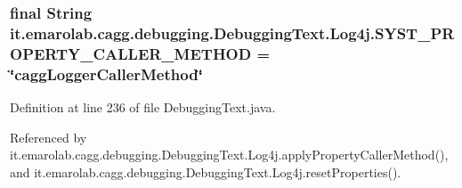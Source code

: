 \hypertarget{classit_1_1emarolab_1_1cagg_1_1debugging_1_1DebuggingText_1_1Log4j_a142198cde93bd152b90429bec42beeb2}{
\subsubsection[{S\-Y\-S\-T\-\_\-\-P\-R\-O\-P\-E\-R\-T\-Y\-\_\-\-C\-A\-L\-L\-E\-R\-\_\-\-M\-E\-T\-H\-O\-D}]{\setlength{\rightskip}{0pt plus 5cm}final String it.\-emarolab.\-cagg.\-debugging.\-Debugging\-Text.\-Log4j.\-S\-Y\-S\-T\-\_\-\-P\-R\-O\-P\-E\-R\-T\-Y\-\_\-\-C\-A\-L\-L\-E\-R\-\_\-\-M\-E\-T\-H\-O\-D = \char`\"{}cagg\-Logger\-Caller\-Method\char`\"{}\hspace{0.3cm}{\ttfamily [static]}}}\label{classit_1_1emarolab_1_1cagg_1_1debugging_1_1DebuggingText_1_1Log4j_a142198cde93bd152b90429bec42beeb2}


Definition at line 236 of file Debugging\-Text.\-java.



Referenced by it.\-emarolab.\-cagg.\-debugging.\-Debugging\-Text.\-Log4j.\-apply\-Property\-Caller\-Method(), and it.\-emarolab.\-cagg.\-debugging.\-Debugging\-Text.\-Log4j.\-reset\-Properties().


